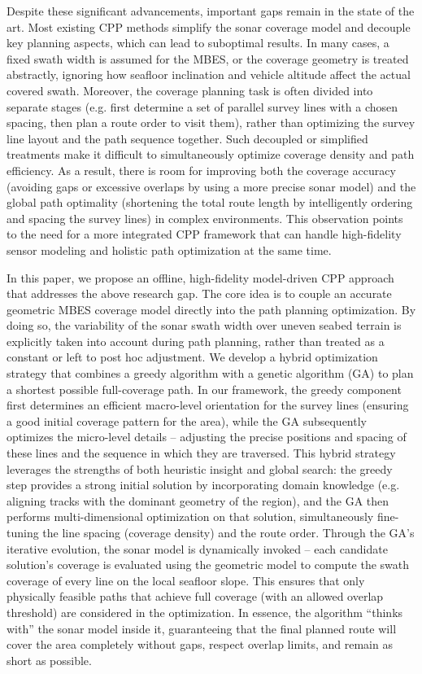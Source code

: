 \documentclass[compress]{cm}
\begin{document}
Despite these significant advancements, important gaps remain in the state of the art. Most existing CPP methods simplify the sonar coverage model and decouple key planning aspects, which can lead to suboptimal results. In many cases, a fixed swath width is assumed for the MBES, or the coverage geometry is treated abstractly, ignoring how seafloor inclination and vehicle altitude affect the actual covered swath. Moreover, the coverage planning task is often divided into separate stages (e.g. first determine a set of parallel survey lines with a chosen spacing, then plan a route order to visit them), rather than optimizing the survey line layout and the path sequence together. Such decoupled or simplified treatments make it difficult to simultaneously optimize coverage density and path efficiency. As a result, there is room for improving both the coverage accuracy (avoiding gaps or excessive overlaps by using a more precise sonar model) and the global path optimality (shortening the total route length by intelligently ordering and spacing the survey lines) in complex environments. This observation points to the need for a more integrated CPP framework that can handle high-fidelity sensor modeling and holistic path optimization at the same time.

In this paper, we propose an offline, high-fidelity model-driven CPP approach that addresses the above research gap. The core idea is to couple an accurate geometric MBES coverage model directly into the path planning optimization. By doing so, the variability of the sonar swath width over uneven seabed terrain is explicitly taken into account during path planning, rather than treated as a constant or left to post hoc adjustment. We develop a hybrid optimization strategy that combines a greedy algorithm with a genetic algorithm (GA) to plan a shortest possible full-coverage path. In our framework, the greedy component first determines an efficient macro-level orientation for the survey lines (ensuring a good initial coverage pattern for the area), while the GA subsequently optimizes the micro-level details – adjusting the precise positions and spacing of these lines and the sequence in which they are traversed. This hybrid strategy leverages the strengths of both heuristic insight and global search: the greedy step provides a strong initial solution by incorporating domain knowledge (e.g. aligning tracks with the dominant geometry of the region), and the GA then performs multi-dimensional optimization on that solution, simultaneously fine-tuning the line spacing (coverage density) and the route order. Through the GA’s iterative evolution, the sonar model is dynamically invoked – each candidate solution’s coverage is evaluated using the geometric model to compute the swath coverage of every line on the local seafloor slope. This ensures that only physically feasible paths that achieve full coverage (with an allowed overlap threshold) are considered in the optimization. In essence, the algorithm “thinks with” the sonar model inside it, guaranteeing that the final planned route will cover the area completely without gaps, respect overlap limits, and remain as short as possible.
\end{document}
